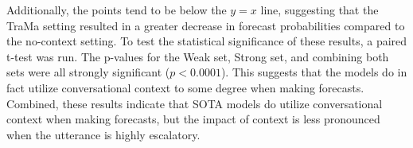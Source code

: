 Additionally, the points tend to be below the $y=x$ line, suggesting that the TraMa setting resulted in a greater decrease in forecast probabilities compared to the no-context setting. 
To test the statistical significance of these results, a paired t-test was run.
The p-values for the Weak set, Strong set, and combining both sets were all strongly significant ($p < 0.0001$). 
This suggests that the models do in fact utilize conversational context to some degree when making forecasts. 
Combined, these results indicate that SOTA models do utilize conversational context when making forecasts, but the impact of context is less pronounced when the utterance is highly escalatory.
